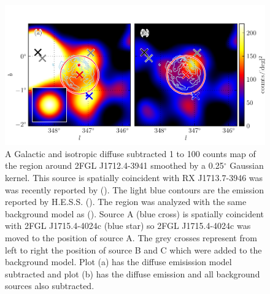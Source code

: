 \documentclass[12pt,preprint]{aastex}
\newcommand{\gev}{\text{GeV}\xspace}
\newcommand{\tev}{\text{TeV}\xspace}
\renewcommand{\deg}{\ensuremath{^\circ}\xspace}
\begin{document}
\begin{figure}
  \begin{center}
    \includegraphics[type=pdf,ext=.pdf,read=.pdf]{source_plots/source_RX_J1713.7-3946}
  \end{center}
  \caption{A Galactic and isotropic diffuse subtracted 1 \gev to 100
  \gev counts map of the region around 2FGL J1712.4-3941 smoothed by a
  0.25\deg Gaussian kernel.  This source is spatially coincident with
  RX J1713.7-3946 was was recently reported by (\cite{rx_j1713_lat}).
  The light blue contours are the \tev emission reported by
  H.E.S.S. (\cite{rx_j1713_hess}).  The region was analyzed with the
  same background model as (\cite{rx_j1713_lat}).  Source A (blue cross)
  is spatially coincident with 2FGL J1715.4-4024c (blue star) so 2FGL
  J1715.4-4024c was moved to the position of source A.  The grey crosses
  represent from left to right the position of source B and C which were
  added to the background model. Plot (a) has the diffuse emisission model
  subtracted and plot (b) has the diffuse emission and all background
  sources also subtracted.
  }\label{2FGL_J1712.4-3941}
\end{figure}
\end{document}
